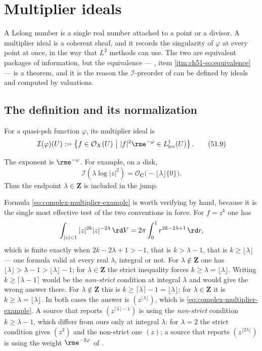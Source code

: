 \section{Multiplier ideals}
\label{sec:ch51-multiplier}

A Lelong number is a single real number attached to a point or a divisor.
A multiplier ideal is a coherent sheaf, and it records the singularity of
\(\varphi\) at every point at once, in the way that \(L^2\) methods can
use.  The two are equivalent packages of information, but the equivalence
--- , item
\cref{itm:ch51-so:equivalence} --- is a theorem, and it is the reason the
\(\mathcal I\)-preorder of  can be defined by
ideals and computed by valuations.

\subsection{The definition and its normalization}
\label{sec:ch51-multiplier-def}

\begin{definition}
\label{def:complex-multiplier-ideal}
For a quasi-psh function \(\varphi\), its multiplier ideal is
\[
 \mathcal I(\varphi)(U)
 :=\left\{f\in\mathcal O_X(U)\ \middle|\
 |f|^2\rme^{-\varphi}\in L^1_{\mathrm{loc}}(U)\right\}.
\tag{51.9}\label{eq:complex-multiplier-ideal}
\]
\end{definition}

The exponent is \(\rme^{-\varphi}\).  For example, on a disk,
\[
 \mathcal I\!\left(\lambda\log|z|^2\right)
       =\mathcal O_{\mathbf C}\bigl(-\lfloor\lambda\rfloor\{0\}\bigr).
\tag{51.10}\label{eq:complex-multiplier-example}
\]
Thus the endpoint \(\lambda\in\mathbf Z\) is included in the jump.

Formula \eqref{eq:complex-multiplier-example} is worth verifying by hand,
because it is the single most effective test of the two conventions in
force.  For \(f=z^k\) one has
\[
 \int_{|z|<1}|z|^{2k}|z|^{-2\lambda}\,\rd V
 =2\pi\int_0^1r^{2k-2\lambda+1}\,\rd r,
\]
which is finite exactly when \(2k-2\lambda+1>-1\), that is
\(k>\lambda-1\), that is \(k\geq\lfloor\lambda\rfloor\) --- one formula
valid at every real \(\lambda\), integral or not.  For
\(\lambda\notin\mathbf Z\) one has
\(\lfloor\lambda\rfloor>\lambda-1>\lfloor\lambda\rfloor-1\); for
\(\lambda\in\mathbf Z\) the strict inequality forces
\(k\geq\lambda=\lfloor\lambda\rfloor\).  Writing \(k\geq\lceil\lambda-1\rceil\)
would be the \emph{non-strict} condition at integral \(\lambda\) and would
give the wrong answer there.  For
\(\lambda\notin\mathbf Z\) this is
\(k\geq\lceil\lambda\rceil-1=\lfloor\lambda\rfloor\); for
\(\lambda\in\mathbf Z\) it is \(k\geq\lambda=\lfloor\lambda\rfloor\).
In both cases the answer is \((z^{\lfloor\lambda\rfloor})\), which is
\eqref{eq:complex-multiplier-example}.  A source that reports
\((z^{\lceil\lambda\rceil-1})\) is using the \emph{non-strict} condition
\(k\geq\lambda-1\), which differs from ours only at integral \(\lambda\):
for \(\lambda=2\) the strict condition gives \((z^2)\) and the non-strict
one \((z)\); a
source that reports \((z^{\lfloor2\lambda\rfloor})\) is using the weight
\(\rme^{-2\varphi}\) of \Cref{warn:ch51-half-log}.

